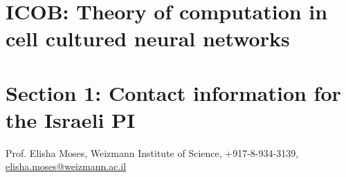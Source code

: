 \section{ICOB: Theory of computation in cell cultured neural networks}
\section{Section 1: Contact information for the Israeli PI}
\noindent Prof. Elisha Moses, Weizmann Institute of Science, +917-8-934-3139, \href{mailto:elisha.moses@weizmann.ac.il}{elisha.moses@weizmann.ac.il}

